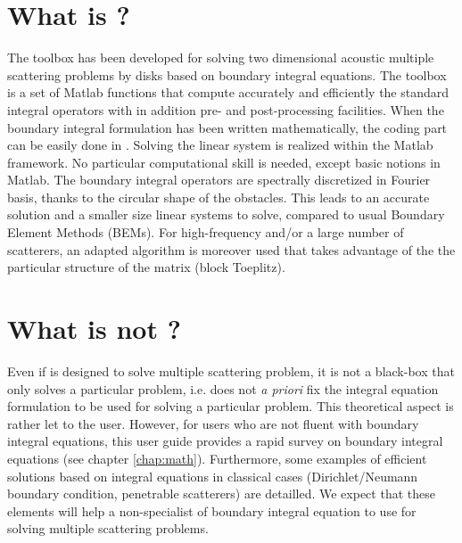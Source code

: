 
\section*{What is \mudiff?}

The toolbox \mudiff has been developed  for solving two dimensional acoustic multiple scattering problems by disks based on boundary integral equations. The toolbox is a set of Matlab functions that compute accurately and efficiently the standard integral operators with in addition pre- and post-processing facilities. When the boundary integral formulation has been written mathematically, the coding part can be easily done in \mudiff. Solving the linear system is realized within the Matlab 
 framework. No particular computational skill is needed, except  basic notions in Matlab.
The boundary integral operators are spectrally discretized in Fourier basis, thanks to the circular shape of the obstacles.
 This leads to an accurate solution and a smaller size linear systems to solve, compared to usual Boundary Element Methods (BEMs). For high-frequency
  and/or a large number of scatterers, an adapted algorithm is moreover used that takes advantage of the the particular structure of the matrix (block Toeplitz).

\section*{What is not \mudiff?}

Even if \mudiff is designed to solve multiple scattering problem, it is not a black-box that only solves a particular problem, i.e.  \mudiff does not
\textit{a priori}  fix the integral equation formulation to be used for solving a particular problem. This theoretical aspect is rather let to the user. However,
 for users who are not fluent with boundary integral equations, this user guide provides a rapid survey on boundary integral equations (see chapter \ref{chap:math}).
 Furthermore, some examples of efficient solutions based on integral equations in classical cases (Dirichlet/Neumann boundary condition, penetrable scatterers)
 are detailled. We expect that these elements will help a non-specialist of boundary integral equation to use \mudiff for solving multiple scattering problems.

